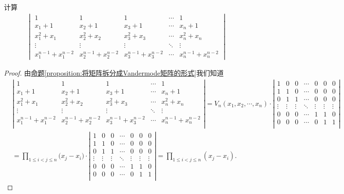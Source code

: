 \documentclass[../../main.tex]{subfiles}%
\begin{document}
\begin{example}
计算
\begin{align*}
\begin{vmatrix}
1&1&1&\cdots&1\\
x_1 + 1&x_2 + 1&x_3 + 1&\cdots&x_n + 1\\
x_1^2 + x_1&x_2^2 + x_2&x_3^2 + x_3&\cdots&x_n^2 + x_n\\
\vdots&\vdots&\vdots&\ddots&\vdots\\
x_1^{n - 1} + x_1^{n - 2}&x_2^{n - 1} + x_2^{n - 2}&x_3^{n - 1} + x_3^{n - 2}&\cdots&x_n^{n - 1} + x_n^{n - 2}
\end{vmatrix}
\end{align*}
\end{example}
\begin{proof}

由\hyperref[proposition:将矩阵拆分成Vandermode矩阵的形式]{命题\ref{proposition:将矩阵拆分成Vandermode矩阵的形式}}我们知道
\begin{align*}
&\left| \begin{matrix}
1&		1&		1&		\cdots&		1\\
x_1+1&		x_2+1&		x_3+1&		\cdots&		x_n+1\\
x_{1}^{2}+x_1&		x_{2}^{2}+x_2&		x_{3}^{2}+x_3&		\cdots&		x_{n}^{2}+x_n\\
\vdots&		\vdots&		\vdots&		\ddots&		\vdots\\
x_{1}^{n-1}+x_{1}^{n-2}&		x_{2}^{n-1}+x_{2}^{n-2}&		x_{3}^{n-1}+x_{3}^{n-2}&		\cdots&		x_{n}^{n-1}+x_{n}^{n-2}\\
\end{matrix} \right|=V_n\left( x_1,x_2,\cdots ,x_n \right) \cdot \left| \begin{matrix}
1&		0&		0&		\cdots&		0&		0&		0\\
1&		1&		0&		\cdots&		0&		0&		0\\
0&		1&		1&		\cdots&		0&		0&		0\\
\vdots&		\vdots&		\vdots&		\ddots&		\vdots&		\vdots&		\vdots\\
0&		0&		0&		\cdots&		1&		1&		0\\
0&		0&		0&		\cdots&		0&		1&		1\\
\end{matrix} \right|
\\
&=\prod_{1\leqslant i<j\leqslant n}{(x_j}-x_i)\cdot \left| \begin{matrix}
1&		0&		0&		\cdots&		0&		0&		0\\
1&		1&		0&		\cdots&		0&		0&		0\\
0&		1&		1&		\cdots&		0&		0&		0\\
\vdots&		\vdots&		\vdots&		\ddots&		\vdots&		\vdots&		\vdots\\
0&		0&		0&		\cdots&		1&		1&		0\\
0&		0&		0&		\cdots&		0&		1&		1\\
\end{matrix} \right|=\prod_{1\leqslant i<j\leqslant n}{\left( x_j-x_i \right)}.
\end{align*} 

\end{proof}
\end{document}
